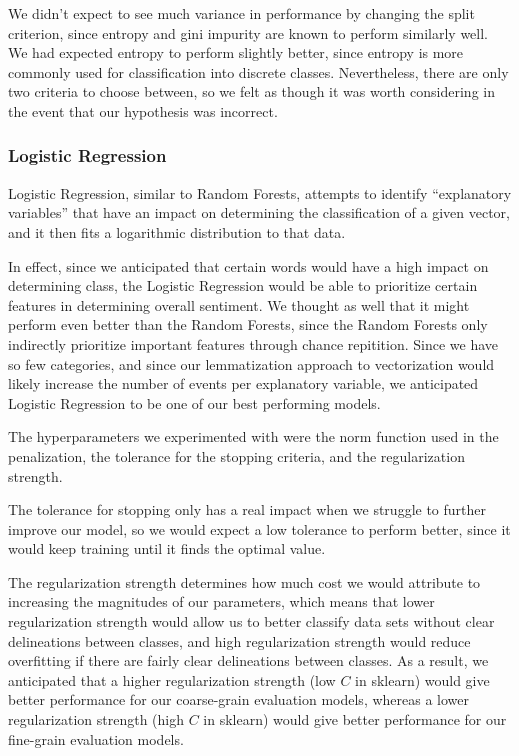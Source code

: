 \documentclass[conference]{IEEEtran}
\begin{document}
We didn't expect to see much variance in performance by changing the split criterion, since entropy and gini impurity are known to perform similarly well. We had expected entropy to perform slightly better, since entropy is more commonly used for classification into discrete classes. Nevertheless, there are only two criteria to choose between, so we felt as though it was worth considering in the event that our hypothesis was incorrect.

\subsubsection{Logistic Regression}

Logistic Regression, similar to Random Forests, attempts to identify ``explanatory variables'' that have an impact on determining the classification of a given vector, and it then fits a logarithmic distribution to that data.

In effect, since we anticipated that certain words would have a high impact on determining class, the Logistic Regression would be able to prioritize certain features in determining overall sentiment. We thought as well that it might perform even better than the Random Forests, since the Random Forests only indirectly prioritize important features through chance repitition. Since we have so few categories, and since our lemmatization approach to vectorization would likely increase the number of events per explanatory variable, we anticipated Logistic Regression to be one of our best performing models.

The hyperparameters we experimented with were the norm function used in the penalization, the tolerance for the stopping criteria, and the regularization strength.

The tolerance for stopping only has a real impact when we struggle to further improve our model, so we would expect a low tolerance to perform better, since it would keep training until it finds the optimal value.

The regularization strength determines how much cost we would attribute to increasing the magnitudes of our parameters, which means that lower regularization strength would allow us to better classify data sets without clear delineations between classes, and high regularization strength would reduce overfitting if there are fairly clear delineations between classes. As a result, we anticipated that a higher regularization strength (low $C$ in sklearn) would give better performance for our coarse-grain evaluation models, whereas a lower regularization strength (high $C$ in sklearn) would give better performance for our fine-grain evaluation models.
\end{document}
